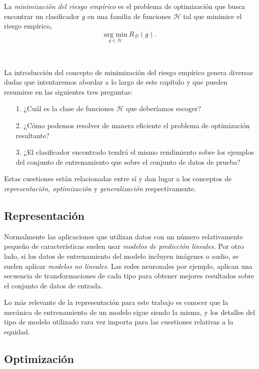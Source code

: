 \documentclass[oneside,openright,titlepage,numbers=noenddot,openany,headinclude,footinclude=true,
cleardoublepage=empty,abstractoff,BCOR=5mm,paper=a4,fontsize=12pt,main=spanish]{scrreprt}
\begin{document}
\begin{definition} \label{def:minrisk}
La \textit{minimización del riesgo empírico} es el problema de optimización que busca encontrar un clasificador $g$ en una familia de funciones $\mathcal{H}$ tal que minimice el riesgo empírico, $$\underset{g\in \mathcal{H}}{\text{arg min}} \  R_{\mathcal{D}}(g).$$
\end{definition}\

La introducción del concepto de minimización del riesgo empírico genera diversas dudas que intentaremos abordar a lo largo de este capítulo y que pueden resumirse en las siguientes tres preguntas:

\begin{itemize}
    \item[1.] ¿Cuál es la clase de funciones $\mathcal{H}$ que deberíamos escoger?
    \item[2.] ¿Cómo podemos resolver de manera eficiente el problema de optimización resultante?
    \item[3.] ¿El clasificador encontrado tendrá el mismo rendimiento sobre los ejemplos del conjunto de entrenamiento que sobre el conjunto de datos de prueba?
\end{itemize}

Estas cuestiones están relacionadas entre sí y dan lugar a los conceptos de \textit{representación, optimización} y \textit{generalización} respectivamente.

\subsection*{Representación}

Normalmente las aplicaciones que utilizan datos con un número relativamente pequeño de características suelen usar \textit{modelos de predicción lineales}. Por otro lado, si los datos de entrenamiento del modelo incluyen imágenes o audio, se suelen aplicar \textit{modelos no lineales}. Las redes neuronales por ejemplo, aplican una secuencia de transformaciones de cada tipo para obtener mejores resultados sobre el conjunto de datos de entrada.

Lo más relevante de la representación para este trabajo es conocer que la mecánica de entrenamiento de un modelo sigue siendo la misma, y los detalles del tipo de modelo utilizado rara vez importa para las cuestiones relativas a la equidad.


\subsection*{Optimización}
\end{document}
